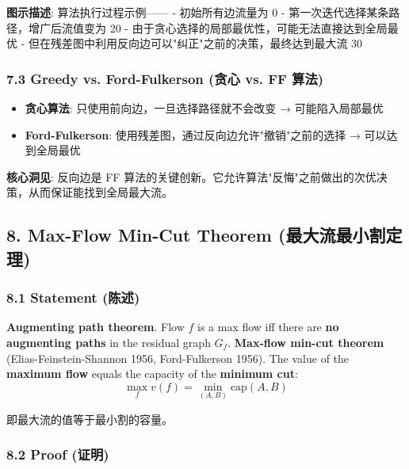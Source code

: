 \documentclass[10pt,a4paper,openany]{ctexbook}
\theoremstyle{definition}
\theoremstyle{remark}
\renewenvironment{quote}
  {\list{}{\leftmargin=1em\rightmargin=0pt\topsep=0.5pt\partopsep=0pt}\item[]}
  {\endlist}
\begin{document}
\begin{quote}
\textbf{图示描述}: 算法执行过程示例——
- 初始所有边流量为 0
- 第一次迭代选择某条路径，增广后流值变为 20
- 由于贪心选择的局部最优性，可能无法直接达到全局最优
- 但在残差图中利用反向边可以"纠正"之前的决策，最终达到最大流 30

\end{quote}

\subsubsection{7.3 Greedy vs. Ford-Fulkerson (贪心 vs. FF 算法)}

\begin{itemize}
\item \textbf{贪心算法}: 只使用前向边，一旦选择路径就不会改变 → 可能陷入局部最优
\item \textbf{Ford-Fulkerson}: 使用残差图，通过反向边允许"撤销"之前的选择 → 可以达到全局最优

\end{itemize}

\begin{quote}
\textbf{核心洞见}: 反向边是 FF 算法的关键创新。它允许算法"反悔"之前做出的次优决策，从而保证能找到全局最大流。

\end{quote}
\vspace{-2pt}

\subsection{8. Max-Flow Min-Cut Theorem (最大流最小割定理)}

\subsubsection{8.1 Statement (陈述)}

\textbf{Augmenting path theorem}. Flow $f$ is a max flow iff there are \textbf{no augmenting paths} in the residual graph $G_f$.
\textbf{Max-flow min-cut theorem} (Elias-Feinstein-Shannon 1956, Ford-Fulkerson 1956). The value of the \textbf{maximum flow} equals the capacity of the \textbf{minimum cut}:
\[
\max_f v(f) = \min_{(A,B)} \text{cap}(A, B)
\]

即最大流的值等于最小割的容量。
\subsubsection{8.2 Proof (证明)}
\end{document}
